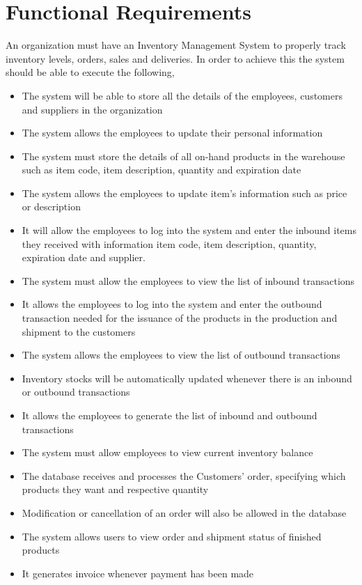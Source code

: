 \section{Functional Requirements}

An organization must have an Inventory Management System to properly track inventory levels, orders, sales and deliveries. In order to achieve this the system should be able to execute the following,

\begin{itemize}
    \item The system will be able to store all the details of the employees, customers and suppliers in the organization
    \item The system allows the employees to update their personal information
    \item The system must store the details of all on-hand products in the warehouse such as item code, item description, quantity and expiration date
    \item The system allows the employees to update item's information such as price or description
    \item It will allow the employees to log into the system and enter the inbound items they received with information item code, item description, quantity, expiration date and supplier. 
    \item The system must allow the employees to view the list of inbound transactions
    \item It allows the employees to log into the system and enter the outbound transaction needed for the issuance of the products in the production and shipment to the customers
    \item The system allows the employees to view the list of outbound transactions
    \item Inventory stocks will be automatically updated whenever there is an inbound or outbound transactions
    \item It allows the employees to generate the list of inbound and outbound transactions 
    \item The system must allow employees to view current inventory balance
    \item The database receives and processes the Customers’ order, specifying which products they want and respective quantity
    \item Modification or cancellation of an order will also be allowed in the database
    \item The system allows users to view order and shipment status of finished products
    \item It generates invoice whenever payment has been made
\end{itemize}
